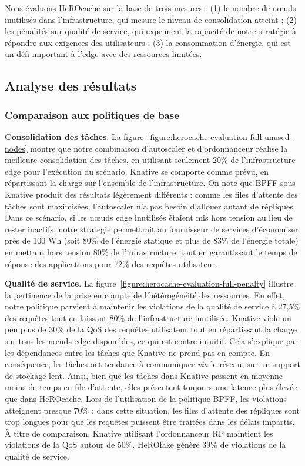 Nous évaluons HeROcache sur la base de trois mesures : (1) le nombre de nœuds inutilisés dans l'infrastructure, qui mesure le niveau de consolidation atteint ; (2) les pénalités sur qualité de service, qui expriment la capacité de notre stratégie à répondre aux exigences des utilisateurs ; (3) la consommation d'énergie, qui est un défi important à l'edge avec des ressources limitées.

\subsection{Analyse des résultats}

\subsubsection{Comparaison aux politiques de base}

\textbf{Consolidation des tâches}. La figure~\ref{figure:herocache-evaluation-full-unused-nodes} montre que notre combinaison d'autoscaler et d'ordonnanceur réalise la meilleure consolidation des tâches, en utilisant seulement 20\% de l'infrastructure edge pour l'exécution du scénario. Knative se comporte comme prévu, en répartissant la charge sur l'ensemble de l'infrastructure. On note que BPFF sous Knative produit des résultats légèrement différents : comme les files d'attente des tâches sont maximisées, l'autoscaler n'a pas besoin d'allouer autant de répliques. Dans ce scénario, si les nœuds edge inutilisés étaient mis hors tension au lieu de rester inactifs, notre stratégie permettrait au fournisseur de services d'économiser près de 100 Wh (soit 80\% de l'énergie statique et plus de 83\% de l'énergie totale) en mettant hors tension 80\% de l'infrastructure, tout en garantissant le temps de réponse des applications pour 72\% des requêtes utilisateur.

\textbf{Qualité de service}. La figure~\ref{figure:herocache-evaluation-full-penalty} illustre la pertinence de la prise en compte de l'hétérogénéité des ressources. En effet, notre politique parvient à maintenir les violations de la qualité de service à 27,5\% des requêtes tout en laissant 80\% de l'infrastructure inutilisée. Knative viole un peu plus de 30\% de la QoS des requêtes utilisateur tout en répartissant la charge sur tous les nœuds edge disponibles, ce qui est contre-intuitif. Cela s'explique par les dépendances entre les tâches que Knative ne prend pas en compte. En conséquence, les tâches ont tendance à communiquer \textit{via} le réseau, sur un support de stockage lent. Ainsi, bien que les tâches dans Knative passent en moyenne moins de temps en file d'attente, elles présentent toujours une latence plus élevée que dans HeROcache. Lors de l'utilisation de la politique BPFF, les violations atteignent presque 70\% : dans cette situation, les files d'attente des répliques sont trop longues pour que les requêtes puissent être traitées dans les délais impartis. À titre de comparaison, Knative utilisant l'ordonnanceur RP maintient les violations de la QoS autour de 50\%. HeROfake génère 39\% de violations de la qualité de service.

